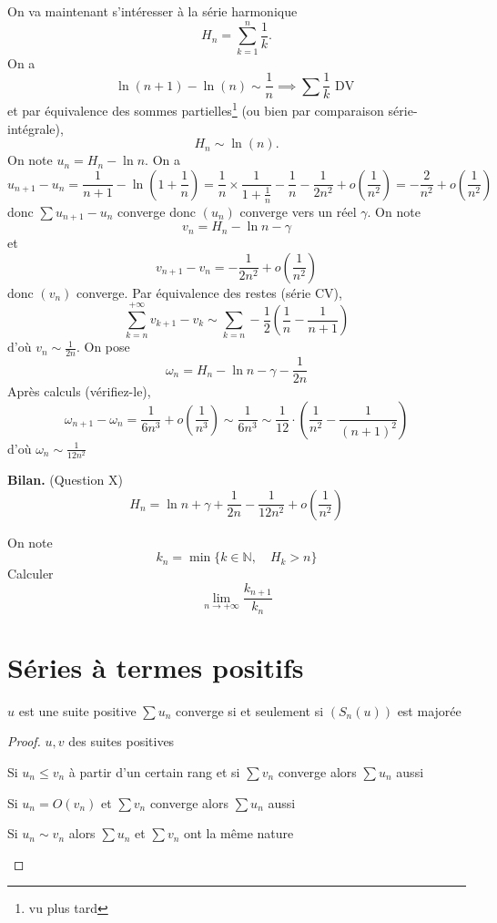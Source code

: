 On va maintenant s'intéresser à la série harmonique \[
    H_n=\sum_{k=1}^n\frac1k.
\]
On a \[
    \ln(n+1)-\ln (n)\sim \frac1n \implies \sum\frac1k \text{ DV }
\]
et par équivalence des sommes partielles\footnote{vu plus tard} (ou bien par comparaison série-intégrale), \[
    H_n\sim\ln(n).
\]
On note $u_n=H_n-\ln n$. On a \[
    u_{n+1}-u_n=\frac1{n+1}-\ln \left( 1+\frac1n \right)=\frac1n\times \frac1{1+\frac1n}-\frac1n-\frac1{2n^2}+o \left( \frac1{n^2} \right)=-\frac2{n^2}+o \left( \frac1{n^2} \right)
\]
donc $\sum u_{n+1}-u_n$ converge donc $(u_n)$ converge vers un réel $\gamma$. On note \[
    v_n=H_n-\ln n-\gamma
\]
et \[
    v_{n+1}-v_n=-\frac1{2n^2}+o \left( \frac1{n^2} \right)
\]
donc $(v_n)$ converge. Par équivalence des restes (série CV), \[
    \sum_{k=n}^{+\infty}v_{k+1}-v_k\sim\sum_{k=n} -\frac12 \left( \frac1n-\frac1{n+1} \right)
\]
d'où $v_n\sim \frac1{2n}$.
On pose \[
    \omega_n=H_n-\ln n-\gamma-\frac1{2n}
\]
Après calculs (vérifiez-le), \[
    \omega_{n+1}-\omega_n=\frac1{6n^3}+o \left( \frac1{n^3} \right)\sim\frac1{6n^3}\sim\frac1{12}\cdot \left( \frac 1{n^2}-\frac1{(n+1)^2} \right)
\]
d'où $\omega_n\sim\frac1{12n^2}$

\textbf{Bilan.} (Question X) \[
    H_n=\ln n+\gamma+\frac1{2n}-\frac1{12n^2}+o \left( \frac1{n^2} \right)
\]

\begin{exo}
    On note \[
        k_n=\min\{k\in\mathbb N, \quad H_k>n\}
    \]
    Calculer \[
        \lim_{n\to+\infty}\frac{k_{n+1}}{k_n}
    \]
\end{exo}

\section{Séries à termes positifs}

\begin{prop}
    \Hyp $u$ est une suite positive
    \Conc $\sum u_n$ converge si et seulement si $(S_n(u))$ est majorée
\end{prop}

\begin{proof}
    \Hyp $u, v$ des suites positives
    \begin{concenum}
    \item Si $u_n\leq v_n$ à partir d'un certain rang et si $\sum v_n$ converge alors $\sum u_n$ aussi
    \item Si $u_n=O(v_n)$ et $\sum v_n$ converge alors $\sum u_n$ aussi
    \item Si $u_n\sim v_n$ alors $\sum u_n$ et $\sum v_n$ ont la même nature
    \end{concenum}
\end{proof}

